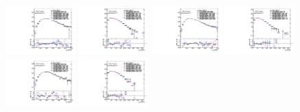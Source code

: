 \begin{figure}[htbp!]
\begin{center}
\includegraphics[angle=270, width=0.24\textwidth]{./figures/boosted/AppendixReweight/Compare/Data_ThreeTag_Sideband_directcompare_leadHCand_trk0_Pt_1.pdf}
\includegraphics[angle=270, width=0.24\textwidth]{./figures/boosted/AppendixReweight/Compare/Data_ThreeTag_Sideband_directcompare_leadHCand_trk1_Pt_1.pdf}
\includegraphics[angle=270, width=0.24\textwidth]{./figures/boosted/AppendixReweight/Compare/Data_ThreeTag_Sideband_directcompare_sublHCand_trk0_Pt_1.pdf}
\includegraphics[angle=270, width=0.24\textwidth]{./figures/boosted/AppendixReweight/Compare/Data_ThreeTag_Sideband_directcompare_sublHCand_trk1_Pt_1.pdf}\\
\includegraphics[angle=270, width=0.24\textwidth]{./figures/boosted/AppendixReweight/Compare/Data_ThreeTag_Control_directcompare_leadHCand_trk0_Pt_1.pdf}
\includegraphics[angle=270, width=0.24\textwidth]{./figures/boosted/AppendixReweight/Compare/Data_ThreeTag_Control_directcompare_leadHCand_trk1_Pt_1.pdf}

\end{center}
\end{figure}
